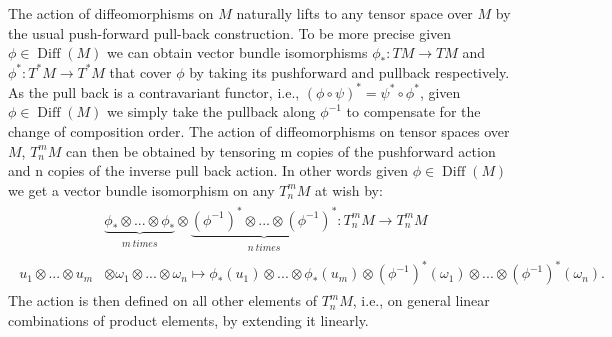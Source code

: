 The action of diffeomorphisms on $M$ naturally lifts to any tensor space over $M$ by the usual push-forward pull-back construction. To be more precise given $\phi \in \operatorname{Diff}(M)$ we can obtain vector bundle isomorphisms $\phi_{\ast} : TM \rightarrow TM $ and $\phi^{\ast} : T^{\ast}M \rightarrow T^{\ast}M$ that cover $\phi$ by taking its pushforward and pullback respectively. As the pull back is a contravariant functor, i.e., $(\phi \circ \psi)^{\ast}=\psi^{\ast}\circ \phi^{\ast}$, given $\phi \in \operatorname{Diff}(M)$ we simply take the pullback along $\phi^{-1}$ to compensate for the change of composition order. The action of diffeomorphisms on tensor spaces over $M$, $T^m_nM$ can then be obtained by tensoring m copies of the pushforward action and n copies of the inverse pull back action. In other words given $\phi \in \operatorname{Diff}(M)$ we get a vector bundle isomorphism on any $T^m_nM$ at wish by:
\begin{align}
\begin{aligned}
    &\underbrace{\phi_{\ast} \otimes ... \otimes \phi_{\ast}}_{\substack{m \  times}} \otimes \underbrace{(\phi^{-1})^{\ast} \otimes ... \otimes (\phi^{-1})^{\ast} }_{\substack{n \  times}} : T^m_nM \longrightarrow T^m_nM \\
    u_1 \otimes ... \otimes u_m &\otimes \omega_1 \otimes ... \otimes \omega_n \longmapsto \phi_{\ast} (u_1) \otimes ... \otimes \phi_{\ast}(u_m) \otimes (\phi^{-1})^{\ast}(\omega_1) \otimes ... \otimes (\phi^{-1})^{\ast}(\omega_n).
\end{aligned}
\end{align}
The action is then defined on all other elements of $T^m_nM$, i.e., on general linear combinations of product elements, by extending it linearly.

\begin{comment}
Note that there is a slight duplication in our notation: Before a superscripted $\ast$ denoted the dual of a linear map, the dual of a vector-space/bundle, etc. Here the superscripted $\ast$ denotes the pull back of a given diffeomorphism. The connection between the two notions and henceforth the reason for the apparent duplication in the notation can be explained regarding the standard definition of the pullback: Let $\phi \in \operatorname{Diff}(M)$, $p \in M$, $u \in T_pM$, and  $\omega \in T^{\ast}_{\phi(p)}M$ then pushforward and pullback of $\phi$ restrict to linear maps $(\phi_{\ast}) _p :  T_pM \rightarrow T_{\phi(p)}M$ and $\phi^{\ast}_{\phi(p)} : T^{\ast}_{\phi(p)}M \rightarrow T^{\ast}_pM$, where the pullback is defined by the requirement $\phi^{\ast}_{\phi(p)}\omega (u) := \omega ((\phi_{\ast})_p u)$. Comparing this with definition \ref{dual} the dual of a linear map we see that the pull back really defines the fiber wise dual of the pushforward. 
\end{comment}


